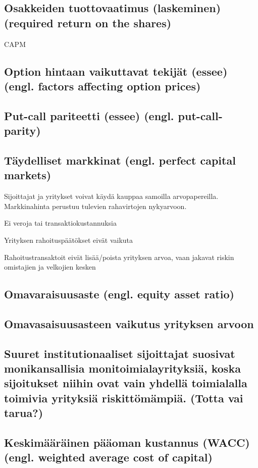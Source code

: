 \documentclass[a4paper]{article}
\begin{document}
\subsection{Osakkeiden tuottovaatimus (laskeminen) (required return on the shares)}

CAPM

\subsection{Option hintaan vaikuttavat tekijät (essee) (engl. factors affecting option prices)}

\subsection{Put-call pariteetti (essee) (engl. put-call-parity)}

\subsection{Täydelliset markkinat (engl. perfect capital markets)}

Sijoittajat ja yritykset voivat käydä kauppaa samoilla arvopapereilla. Markkinahinta perustuu tulevien rahavirtojen nykyarvoon.

Ei veroja tai transaktiokustannuksia

Yrityksen rahoituspäätökset eivät vaikuta

Rahoitustransaktoit eivät lisää/poista yrityksen arvoa, vaan jakavat riskin omistajien ja velkojien kesken

\subsection{Omavaraisuusaste (engl. equity asset ratio)}

\subsection{Omavasaisuusasteen vaikutus yrityksen arvoon}

\subsection{Suuret institutionaaliset sijoittajat suosivat monikansallisia monitoimialayrityksiä, koska sijoitukset niihin ovat vain yhdellä toimialalla toimivia yrityksiä riskittömämpiä. (Totta vai tarua?)}

\subsection{Keskimääräinen pääoman kustannus (WACC) (engl. weighted average cost of capital)}
\end{document}
